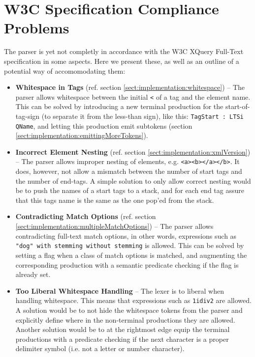 \section{W3C Specification Compliance Problems}
\label{sect:future:knownBugs}
The parser is yet not completly in accordance with the
W3C XQuery Full-Text specification in some aspects. Here we present these, as
well as an outline of a potential way of accomomodating them: 

\begin{itemize}
\item \textbf{Whitespace in Tags} (ref. section \ref{sect:implementation:whitespace}) -- The parser allows whitespace between the initial \verb!<! of a tag and the element name. This can be solved by introducing a new terminal production for the start-of-tag-sign (to separate it from the less-than sign), like this: \verb!TagStart : LTSi QName!, and letting this production emit subtokens (section \ref{sect:implementation:emittingMoreTokens}).

\item \textbf{Incorrect Element Nesting} (ref. section \ref{sect:implementation:xmlVersion}) -- The parser allows improper nesting of elements, e.g. \verb!<a><b></a></b>!. It does, however, not allow a mismatch between the number of start tags and the number of end-tags. A simple solution to only allow correct nesting would be to push the names of a start tags to a stack, and for each end tag assure that this tags name is the same as the one pop'ed from the stack.

\item \textbf{Contradicting Match Options} (ref. section \ref{sect:implementation:multipleMatchOptions}) -- The parser allows contradicting full-text match options, in other words, expressions such as \verb!"dog" with stemming without stemming! is allowed. This can be solved by setting a flag when a class of match options is matched, and augmenting the corresponding production with a semantic predicate checking if the flag is already set.

\item \textbf{Too Liberal Whitespace Handling} -- The lexer is to liberal when handling whitespace. This means that expressions such as \verb!1idiv2! are allowed. A solution would be to not hide the whitespace tokens from the parser and explicitly define where in the non-terminal productions they are allowed. Another solution would be to at the rightmost edge equip the terminal productions with a predicate checking if the next character is a proper delimiter symbol (i.e. not a letter or number character).


\end{itemize}
